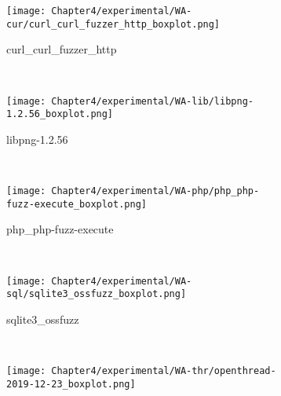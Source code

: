 \begin{figure}[!t]
    \begin{adjustbox}{center,max width=1.3\textwidth}
        \begin{subfigure}[t]{0.3\textwidth}
            \centering
            \texttt{[image: Chapter4/experimental/WA-cur/curl\_curl\_fuzzer\_http\_boxplot.png]}
            \vspace*{-5mm}
            \caption{curl\_curl\_fuzzer\_http}
            \label{box:a}
            \vspace*{5mm}
        \end{subfigure}
        ~
        \begin{subfigure}[t]{0.3\textwidth}
            \centering
            \texttt{[image: Chapter4/experimental/WA-lib/libpng-1.2.56\_boxplot.png]}
            \vspace*{-5mm}
            \caption{libpng-1.2.56}
            \label{box:b}
            \vspace*{5mm}
        \end{subfigure}
    \end{adjustbox}
    ~
    \begin{adjustbox}{center,max width=1.3\textwidth}
        \begin{subfigure}[t]{0.3\textwidth}
            \centering
            \texttt{[image: Chapter4/experimental/WA-php/php\_php-fuzz-execute\_boxplot.png]}
            \vspace*{-5mm}
            \caption{php\_php-fuzz-execute}
            \label{box:c}
            \vspace*{5mm}
        \end{subfigure}
        ~
        \begin{subfigure}[t]{0.3\textwidth}
            \centering
            \texttt{[image: Chapter4/experimental/WA-sql/sqlite3\_ossfuzz\_boxplot.png]}
            \vspace*{-5mm}
            \caption{sqlite3\_ossfuzz}
            \label{box:d}
            \vspace*{5mm}
        \end{subfigure}
    \end{adjustbox}
    ~
    \begin{adjustbox}{center,max width=1.3\textwidth}
        \begin{subfigure}[t]{0.3\textwidth}
            \centering
            \texttt{[image: Chapter4/experimental/WA-thr/openthread-2019-12-23\_boxplot.png]}

\end{subfigure}
\end{adjustbox}
\end{figure}

